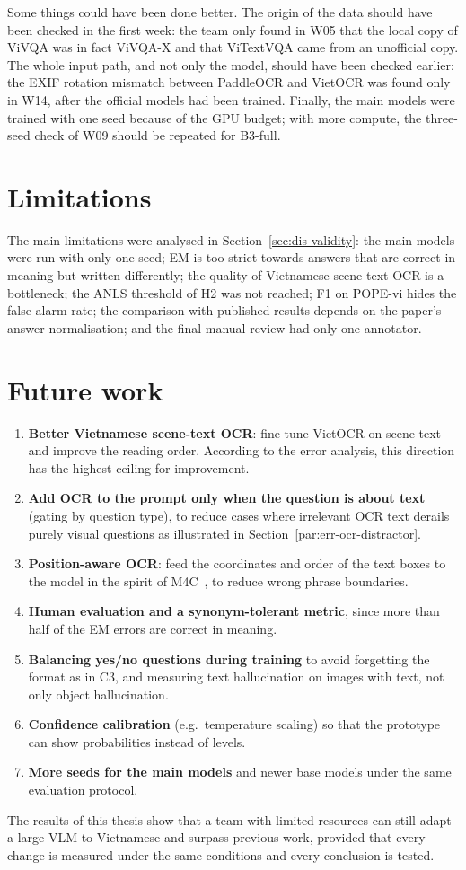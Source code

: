 Some things could have been done better. The origin of the data should have been checked in
the first week: the team only found in W05 that the local copy of ViVQA was in fact ViVQA-X
and that ViTextVQA came from an unofficial copy. The whole input path, and not only the model,
should have been checked earlier: the EXIF rotation mismatch between PaddleOCR and VietOCR was
found only in W14, after the official models had been trained. Finally, the main models were
trained with one seed because of the GPU budget; with more compute, the three-seed check of
W09 should be repeated for B3-full.

\section{Limitations}
\label{sec:con-limits}

The main limitations were analysed in Section~\ref{sec:dis-validity}: the main models were run
with only one seed; EM is too strict towards answers that are correct in meaning but written
differently; the quality of Vietnamese scene-text OCR is a bottleneck; the ANLS threshold of H2
was not reached; F1 on POPE-vi hides the false-alarm rate; the comparison with published results
depends on the paper's answer normalisation; and the final manual review had only one
annotator.

\section{Future work}
\label{sec:con-future}

\begin{enumerate}
  \item \textbf{Better Vietnamese scene-text OCR}: fine-tune VietOCR on scene text and improve
  the reading order. According to the error analysis, this direction has the highest ceiling
  for improvement.
  \item \textbf{Add OCR to the prompt only when the question is about text} (gating by
  question type), to reduce cases where irrelevant OCR text derails purely visual questions
  as illustrated in Section~\ref{par:err-ocr-distractor}.
  \item \textbf{Position-aware OCR}: feed the coordinates and order of the text boxes to the
  model in the spirit of M4C~\cite{hu2020m4c}, to reduce wrong phrase boundaries.
  \item \textbf{Human evaluation and a synonym-tolerant metric}, since more than half of the EM
  errors are correct in meaning.
  \item \textbf{Balancing yes/no questions during training} to avoid forgetting the format as
  in C3, and measuring text hallucination on images with text, not only object hallucination.
  \item \textbf{Confidence calibration} (e.g.\ temperature scaling) so that the prototype can
  show probabilities instead of levels.
  \item \textbf{More seeds for the main models} and newer base models under the same evaluation
  protocol.
\end{enumerate}

The results of this thesis show that a team with limited resources can still adapt a large VLM
to Vietnamese and surpass previous work, provided that every change is measured under the same
conditions and every conclusion is tested.
